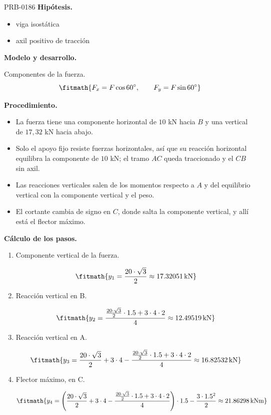 \begin{studiumworked}{PRB-0186}
\textbf{Hipótesis.}\begin{itemize}\item viga isostática
\item axil positivo de tracción\end{itemize}

\textbf{Modelo y desarrollo.}

Componentes de la fuerza.\[\fitmath{F_x = F\cos 60^{\circ},\qquad F_y = F\sin 60^{\circ}}\]

\textbf{Procedimiento.}\begin{itemize}\item La fuerza tiene una componente horizontal de $10$ kN hacia $B$ y una vertical de $17{,}32$ kN hacia abajo.
\item Solo el apoyo fijo resiste fuerzas horizontales, así que su reacción horizontal equilibra la componente de $10$ kN; el tramo $AC$ queda traccionado y el $CB$ sin axil.
\item Las reacciones verticales salen de los momentos respecto a $A$ y del equilibrio vertical con la componente vertical y el peso.
\item El cortante cambia de signo en $C$, donde salta la componente vertical, y allí está el flector máximo.\end{itemize}

\textbf{Cálculo de los pasos.}

\begin{enumerate}

\item Componente vertical de la fuerza.

\[\fitmath{y_{1}=\frac{20\cdot \sqrt{3}}{2}\approx 17.32051\,\mathrm{kN}}\]

\item Reacción vertical en B.

\[\fitmath{y_{2}=\frac{\frac{20\cdot \sqrt{3}}{2}\cdot 1.5+3\cdot 4\cdot 2}{4}\approx 12.49519\,\mathrm{kN}}\]

\item Reacción vertical en A.

\[\fitmath{y_{3}=\frac{20\cdot \sqrt{3}}{2}+3\cdot 4-\frac{\frac{20\cdot \sqrt{3}}{2}\cdot 1.5+3\cdot 4\cdot 2}{4}\approx 16.82532\,\mathrm{kN}}\]

\item Flector máximo, en C.

\[\fitmath{y_{4}=\left(\frac{20\cdot \sqrt{3}}{2}+3\cdot 4-\frac{\frac{20\cdot \sqrt{3}}{2}\cdot 1.5+3\cdot 4\cdot 2}{4}\right)\cdot 1.5-\frac{3\cdot {1.5}^{2}}{2}\approx 21.86298\,\mathrm{kN m}}\]


\end{enumerate}
\end{studiumworked}
